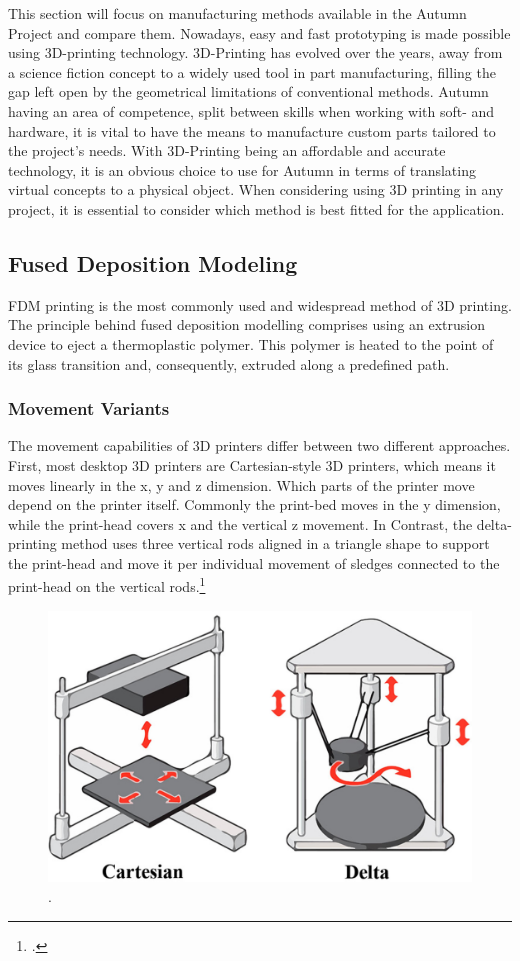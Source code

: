 This section will focus on manufacturing methods available in the Autumn Project and compare them. Nowadays, easy and fast prototyping is made possible using 3D-printing technology. 3D-Printing has evolved over the years, away from a science fiction concept to a widely used tool in part manufacturing, filling the gap left open by the geometrical limitations of conventional methods.\newline
Autumn having an area of competence, split between skills when working with soft- and hardware, it is vital to have the means to manufacture custom parts tailored to the project's needs. With 3D-Printing being an affordable and accurate technology, it is an obvious choice to use for Autumn in terms of translating virtual concepts to a physical object.
When considering using 3D printing in any project, it is essential to consider which method is best fitted for the application.

\subsection{Fused Deposition Modeling}

FDM printing is the most commonly used and widespread method of 3D printing. The principle behind fused deposition modelling comprises using an extrusion device to eject a thermoplastic polymer. This polymer is heated to the point of its glass transition and, consequently, extruded along a predefined path.

\subsubsection{Movement Variants}

The movement capabilities of 3D printers differ between two different approaches. First, most desktop 3D printers are Cartesian-style 3D printers, which means it moves linearly in the x, y and z dimension.
Which parts of the printer move depend on the printer itself. Commonly the print-bed moves in the y dimension, while the print-head covers x and the vertical z movement. In Contrast, the delta-printing method uses three vertical rods aligned in a triangle shape to support the print-head and move it per individual movement of sledges connected to the print-head on the vertical rods.\footcite{all3dpFDM3DPrinting2020}\newline

\begin{figure}[h]
	\centering
	\includegraphics[width=0.6\linewidth]{img/cartesianDeltaPrinting}
	\caption{.}
	\label{fig:custom_parts_printerMovement}
\end{figure}

